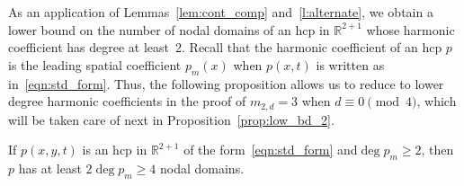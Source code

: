 \documentclass[10pt]{amsart}
\theoremstyle{definition}\newtheorem{defi}[theo]{Definition}\newtheorem{rema}[theo]{Remark}\newtheorem{exam}[theo]{Example}\newtheorem{exem}[theo]{Example}\newtheorem{nota}[theo]{Notation}
\newcommand{\R}{\mathbb{R}}
\begin{document}
As an application of Lemmas~\ref{lem:cont_comp} and~\ref{l:alternate}, we obtain a lower bound on the number of nodal domains of an hcp in $\R^{2+1}$ whose harmonic coefficient has degree at least~2. Recall that the harmonic coefficient of an hcp $p$ is the leading spatial coefficient $p_m(x)$ when $p(x,t)$ is written as in~\eqref{eqn:std_form}. Thus, the following proposition allows us to reduce to lower degree harmonic coefficients in the proof of $m_{2,d} = 3$ when $d \equiv 0 \pmod{4}$, which will be taken care of next in Proposition~\ref{prop:low_bd_2}.

\begin{prop}\label{prop:low_bd}
If $p(x,y,t)$ is an hcp in $\R^{2+1}$ of the form~\eqref{eqn:std_form} and\linebreak ${\deg p_m \ge 2}$, then $p$ has at least $2 \deg p_m \ge 4$ nodal domains.
\end{prop}
\end{document}
